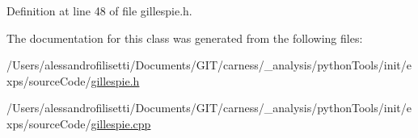 Definition at line 48 of file gillespie.\+h.



The documentation for this class was generated from the following files\+:\begin{DoxyCompactItemize}
\item 
/\+Users/alessandrofilisetti/\+Documents/\+G\+I\+T/carness/\+\_\+analysis/python\+Tools/init/exps/source\+Code/\hyperlink{a00066}{gillespie.\+h}\item 
/\+Users/alessandrofilisetti/\+Documents/\+G\+I\+T/carness/\+\_\+analysis/python\+Tools/init/exps/source\+Code/\hyperlink{a00064}{gillespie.\+cpp}\end{DoxyCompactItemize}
